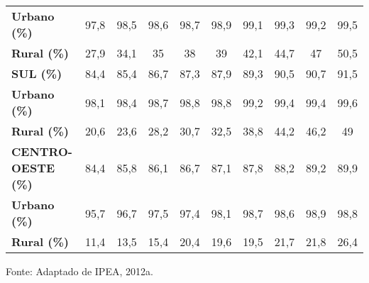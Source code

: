 \begin{center}
\begin{table}[htbp]
\begin{tabular}{p{8.355em}c|c|c|c|c|c|c|c|c}
		\rowcolor[rgb]{ .992,  .914,  .851} \textbf{Urbano (\%)} & 97,8  & 98,5  & 98,6  & 98,7  & 98,9  & 99,1  & 99,3  & 99,2  & 99,5 \\
		\textbf{Rural (\%)} & 27,9  & 34,1  & 35    & 38    & 39    & 42,1  & 44,7  & 47    & 50,5 \\
		\rowcolor[rgb]{ .984,  .831,  .706} \textbf{SUL (\%)} & 84,4  & 85,4  & 86,7  & 87,3  & 87,9  & 89,3  & 90,5  & 90,7  & 91,5 \\
		\textbf{Urbano (\%)} & 98,1  & 98,4  & 98,7  & 98,8  & 98,8  & 99,2  & 99,4  & 99,4  & 99,6 \\
		\rowcolor[rgb]{ .992,  .914,  .851} \textbf{Rural (\%)} & 20,6  & 23,6  & 28,2  & 30,7  & 32,5  & 38,8  & 44,2  & 46,2  & 49 \\
		\rowcolor[rgb]{ .984,  .831,  .706} \textbf{CENTRO-OESTE (\%)} & 84,4  & 85,8  & 86,1  & 86,7  & 87,1  & 87,8  & 88,2  & 89,2  & 89,9 \\
		\rowcolor[rgb]{ .992,  .914,  .851} \textbf{Urbano (\%)} & 95,7  & 96,7  & 97,5  & 97,4  & 98,1  & 98,7  & 98,6  & 98,9  & 98,8 \\
		\textbf{Rural (\%)} & 11,4  & 13,5  & 15,4  & 20,4  & 19,6  & 19,5  & 21,7  & 21,8  & 26,4 \\
	\end{tabular}%

	\label{tab:cobertura_rsu}%
\end{table}%
Fonte: Adaptado de IPEA, 2012a.
\end{center}